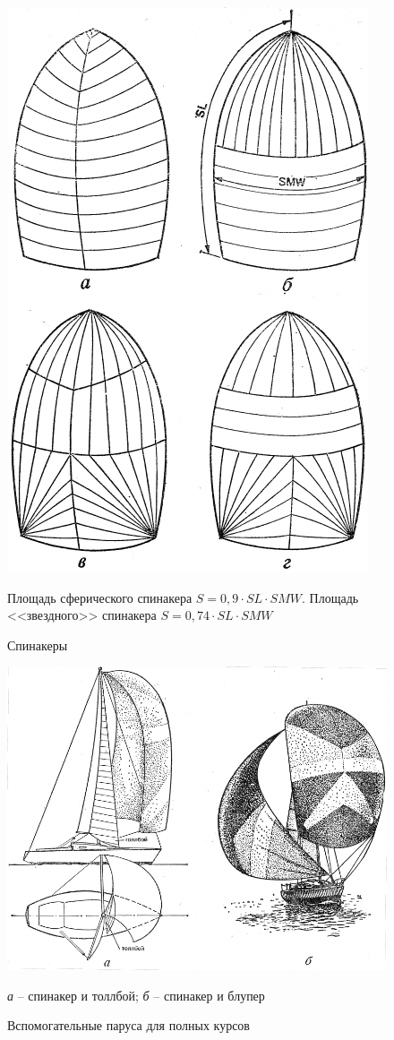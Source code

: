 \documentclass[a4paper, 12pt, twoside, final, book, russian, fittopage, cyremdash]{ncc}
\begin{document}
\begin{figure}[htb]
  \centering{}
  \includegraphics[scale=1.2]{0042P}
  \caption{Спинакеры}
  \label{fig:42}
  \small
  \centering{}
  Площадь сферического спинакера $S = 0,9 \cdot SL \cdot SMW$. Площадь <<звездного>> спинакера $ S = 0,74 \cdot SL \cdot SMW$
\end{figure}

\begin{figure}[htb]
  \centering{}
  \includegraphics[scale=1.3]{0043P}
  \caption{Вспомогательные паруса для полных курсов}
  \label{fig:43}
  \small
  \centering{}
  \textit{а} \--- спинакер и толлбой; \textit{б} \--- спинакер и блупер
\end{figure}
\end{document}
